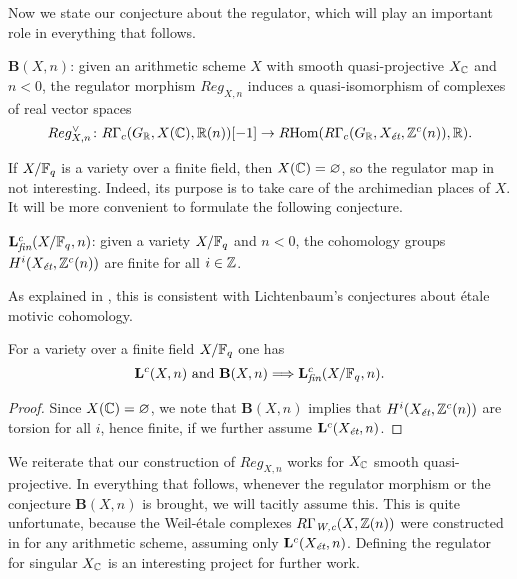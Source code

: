 \documentclass{article}
\numberwithin{equation}{section}
\begin{document}
Now we state our conjecture about the regulator, which will play an important
role in everything that follows.

\begin{conjecture}
  $\mathbf{B} (X,n)$: given an arithmetic scheme $X$ with smooth
  quasi-projective $X_\CC$ and $n < 0$, the regulator morphism $Reg_{X,n}$
  induces a quasi-isomorphism of complexes of real vector spaces
  \[ Reg_{X,n}^\vee\colon R\Gamma_c (G_\RR, X (\CC), \RR (n)) [-1] \to
    \RHom (R\Gamma_c (G_\RR, X_\et, \ZZ^c (n)), \RR). \]
\end{conjecture}

If $X/\FF_q$ is a variety over a finite field, then $X (\CC) = \emptyset$,
so the regulator map in not interesting. Indeed, its purpose is to take care
of the archimedian places of $X$. It will be more convenient to formulate the
following conjecture.

\begin{conjecture}
  $\mathbf{L}_\fin^c (X/\FF_q,n)$: given a variety $X/\FF_q$ and $n < 0$,
  the cohomology groups $H^i (X_\et, \ZZ^c (n))$ are finite for all $i \in \ZZ$.
\end{conjecture}

As explained in \cite[\S 8]{Beshenov-Weil-etale-1}, this is consistent with
Lichtenbaum's conjectures about étale motivic cohomology.

\begin{lemma}
  For a variety over a finite field $X/\FF_q$ one has
  \[ \mathbf{L}^c (X,n) \text{ and } \mathbf{B} (X,n)
    \Longrightarrow \mathbf{L}_\fin^c (X/\FF_q,n). \]

  \begin{proof}
    Since $X (\CC) = \emptyset$, we note that $\mathbf{B} (X,n)$ implies that
    $H^i (X_\et, \ZZ^c (n))$ are torsion for all $i$, hence finite, if we
    further assume $\mathbf{L}^c (X_\et,n)$.
  \end{proof}
\end{lemma}

\begin{remark}
  We reiterate that our construction of $Reg_{X,n}$ works for $X_\CC$ smooth
  quasi-projective. In everything that follows, whenever the regulator morphism
  or the conjecture $\mathbf{B} (X,n)$ is brought, we will tacitly assume this.
  This is quite unfortunate, because the Weil-étale complexes
  $R\Gamma_\Wc (X, \ZZ(n))$ were constructed in \cite{Beshenov-Weil-etale-1} for
  any arithmetic scheme, assuming only $\mathbf{L}^c (X_\et,n)$. Defining the
  regulator for singular $X_\CC$ is an interesting project for further work.
\end{remark}
\end{document}
